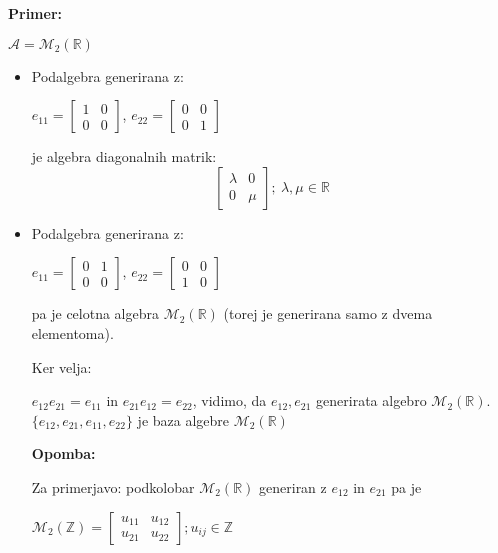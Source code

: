 \documentclass[a4paper]{article}
\newcounter{environment:definition_counter}
\newcounter{environment:theorem_counter}
\newcounter{environment:statement_counter}
\newcounter{example:example_counter}
\newenvironment{example}
{\textbf{Primer:}\\}
{\setcounter{example:example_counter}{0}}
\newenvironment{example_case}
{\refstepcounter{example:example_counter} \arabic{example:example_counter}.}
{\\}
\newenvironment{remark}
{\textbf{Opomba:}}
{}
\begin{document}
\begin{example}
\begin{example_case}
$\mathcal{A} = \mathcal{M}_2(\mathbb{R})$ 
\begin{itemize}
\item Podalgebra generirana z:

$e_{11} = \begin{bmatrix}
		1 & 0 \\
		0 & 0
	  \end{bmatrix}$, 
$e_{22} = \begin{bmatrix}
		0 & 0 \\
		0 & 1
	  \end{bmatrix}$
	  
je algebra diagonalnih matrik: 
$$\begin{bmatrix}
	   \lambda & 0 \\
		0 & \mu
		
	  \end{bmatrix}; \ \lambda, \mu \in \mathbb{R}$$ 
\item Podalgebra generirana z:

$e_{11} = \begin{bmatrix}
		0 & 1 \\
		0 & 0
	  \end{bmatrix}$, 
$e_{22} = \begin{bmatrix}
		0 & 0 \\
		1 & 0
	  \end{bmatrix}$
	  
pa je celotna algebra $\mathcal{M}_2(\mathbb{R})$ (torej je generirana samo z dvema elementoma).

Ker velja:

$e_{12} e_{21} = e_{11}$ in $e_{21} e_{12} = e_{22}$, vidimo, da $e_{12}, e_{21}$ generirata algebro $\mathcal{M}_2(\mathbb{R})$.  
$\{e_{12}, e_{21}, e_{11}, e_{22} \}$ je baza algebre $\mathcal{M}_2(\mathbb{R})$

\begin{remark}

Za primerjavo: podkolobar $\mathcal{M}_2(\mathbb{R})$ generiran z $e_{12}$ in $e_{21}$ pa je 

$\mathcal{M}_2(\mathbb{Z})= \begin{bmatrix}
		u_{11} & u_{12} \\
		u_{21} & u_{22}
	  \end{bmatrix}; u_{ij} \in \mathbb{Z}$
\end{remark}
\end{itemize}\leavevmode
\end{example_case}
\end{example}
\end{document}
